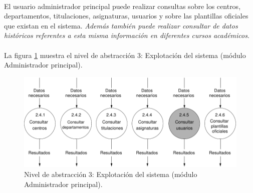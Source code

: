 \paragraph{}El usuario administrador principal puede realizar consultas sobre
los centros, departamentos, titulaciones, asignaturas, usuarios y sobre
las plantillas oficiales que existan en el sistema.
\textit{Además también puede realizar consultar de datos históricos referentes a
esta misma información en diferentes cursos académicos}.

\paragraph{}La figura \ref{diagramaNivel3-ExplotacionSistema-adminPrincipal}
muestra el nivel de abstracción 3: Explotación del sistema (módulo Administrador
principal).

  \begin{figure}[!ht]
    \begin{center}
      \includegraphics[]{08.Analisis_Funcional/8.2.DFDs/Niveles/Nivel3/AdministradorPrincipal/ExplotacionSistema/Diagramas/nivel3-ExplotacionSistema.pdf}
      \caption{Nivel de abstracción 3: Explotación del sistema (módulo
      Administrador principal).}
      \label{diagramaNivel3-ExplotacionSistema-adminPrincipal}
    \end{center}
  \end{figure}